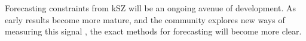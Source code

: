 Forecasting constraints from kSZ will be an ongoing avenue of development. As early results become
more mature, and the community explores new ways of measuring this signal 
\cite{hand12,keisler13,planck12-37,schaan15,hill16,soergel16}, the exact methods for forecasting
will become more clear.












